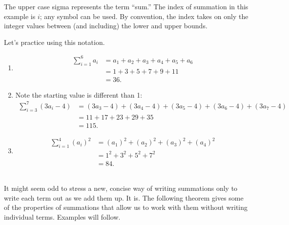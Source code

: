 The upper case sigma represents the term ``sum.'' The index of summation in this example is $i$; any symbol can be used. By convention, the index takes on only the integer values between (and including) the lower and upper bounds. 

Let's practice using this notation.\\

{\begin{enumerate}
		\item		\noindent\vskip-45pt%
						\begin{align*}
						\sum_{i=1}^6 a_i &= a_1+a_2+a_3+a_4+a_5+a_6\\
														&=	1+3+5+7+9+11 \\
														&=	36.
					\end{align*}
		\item	Note the starting value is different than 1:
					\begin{align*}
					\sum_{i=3}^7 (3a_i-4) &= (3a_3-4)+(3a_4-4)+(3a_5-4)+(3a_6-4)+(3a_7-4) \\
														&= 11+17+23+29+35 \\
														&= 115.
					\end{align*}
		\item		\noindent\vskip-45pt%
						\begin{align*}
						\sum_{i=1}^4 (a_i)^2 &=	(a_1)^2+(a_2)^2+(a_3)^2+(a_4)^2\\
																&=	1^2+3^2+5^2+7^2 \\
																&=	84.
						\end{align*}
\end{enumerate}	
\baselineskip											
}\\

It might seem odd to stress a new, concise way of writing summations only to write each term out as we add them up. It is. The following theorem gives some of the properties of summations that allow us to work with them without writing individual terms. Examples will follow.

